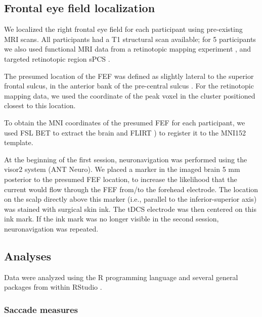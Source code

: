 \documentclass[11pt,english,]{memoir}
\begin{document}
\hypertarget{frontal-eye-field-localization}{%
\subsection{Frontal eye field localization}\label{frontal-eye-field-localization}}

We localized the right frontal eye field for each participant using pre-existing MRI scans. All participants had a T1 structural scan available; for 5 participants we also used functional MRI data from a retinotopic mapping experiment \autocite{VanEs2017}, and targeted retinotopic region sPCS \autocite{Mackey2017}.

The presumed location of the FEF was defined as slightly lateral to the superior frontal sulcus, in the anterior bank of the pre-central sulcus \autocites{Amiez2009}{Blanke2000}{Vernet2014}{Mackey2017}. For the retinotopic mapping data, we used the coordinate of the peak voxel in the cluster positioned closest to this location.

To obtain the MNI coordinates of the presumed FEF for each participant, we used FSL \autocites{Jenkinson2012}{Smith2004} BET \autocite{Smith2002} to extract the brain and FLIRT \autocites{Jenkinson2002}{Jenkinson2001}) to register it to the MNI152 template.

At the beginning of the first session, neuronavigation was performed using the visor2 system (ANT Neuro). We placed a marker in the imaged brain 5 mm posterior to the presumed FEF location, to increase the likelihood that the current would flow through the FEF from/to the forehead electrode. The location on the scalp directly above this marker (i.e., parallel to the inferior-superior axis) was stained with surgical skin ink. The tDCS electrode was then centered on this ink mark. If the ink mark was no longer visible in the second session, neuronavigation was repeated.

\hypertarget{analyses}{%
\subsection{Analyses}\label{analyses}}

Data were analyzed using the R programming language \autocite{R-base} and several general packages \autocites{Wickham2017}{R-tidyverse}{R-broom}{R-cowplot} from within RStudio \autocite{RStudio2016}.

\hypertarget{saccade-measures}{%
\subsubsection{Saccade measures}\label{saccade-measures}}
\end{document}
